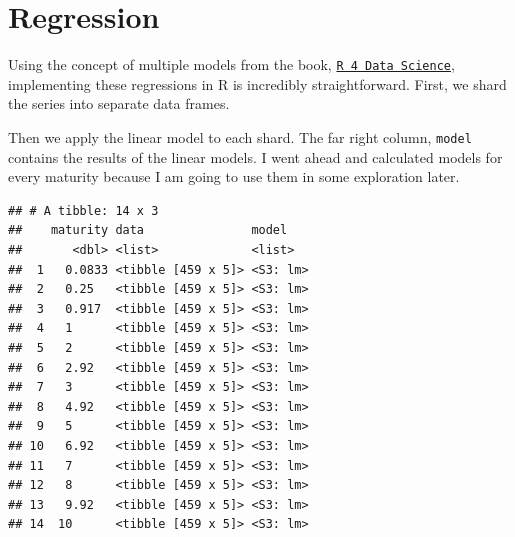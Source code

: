 \documentclass[]{book}
\newenvironment{Shaded}{\begin{snugshade}}{\end{snugshade}}
\newcommand{\CommentTok}[1]{\textcolor[rgb]{0.56,0.35,0.01}{\textit{#1}}}
\newcommand{\DataTypeTok}[1]{\textcolor[rgb]{0.13,0.29,0.53}{#1}}
\newcommand{\KeywordTok}[1]{\textcolor[rgb]{0.13,0.29,0.53}{\textbf{#1}}}
\newcommand{\NormalTok}[1]{#1}
\newcommand{\OperatorTok}[1]{\textcolor[rgb]{0.81,0.36,0.00}{\textbf{#1}}}
\newcommand{\StringTok}[1]{\textcolor[rgb]{0.31,0.60,0.02}{#1}}
\theoremstyle{definition}
\theoremstyle{definition}
\theoremstyle{definition}
\theoremstyle{remark}
\begin{document}
\hypertarget{regression}{%
\section{Regression}\label{regression}}

Using the concept of multiple models from the book,
\href{http://r4ds.had.co.nz/many-models.html}{\texttt{R\ 4\ Data\ Science}},
implementing these regressions in R is incredibly straightforward.
First, we shard the series into separate data frames.

\begin{Shaded}
\end{Shaded}

Then we apply the linear model to each shard. The far right column,
\texttt{model} contains the results of the linear models. I went ahead
and calculated models for every maturity because I am going to use them
in some exploration later.

\begin{Shaded}
\end{Shaded}

\begin{verbatim}
## # A tibble: 14 x 3
##    maturity data               model   
##       <dbl> <list>             <list>  
##  1   0.0833 <tibble [459 x 5]> <S3: lm>
##  2   0.25   <tibble [459 x 5]> <S3: lm>
##  3   0.917  <tibble [459 x 5]> <S3: lm>
##  4   1      <tibble [459 x 5]> <S3: lm>
##  5   2      <tibble [459 x 5]> <S3: lm>
##  6   2.92   <tibble [459 x 5]> <S3: lm>
##  7   3      <tibble [459 x 5]> <S3: lm>
##  8   4.92   <tibble [459 x 5]> <S3: lm>
##  9   5      <tibble [459 x 5]> <S3: lm>
## 10   6.92   <tibble [459 x 5]> <S3: lm>
## 11   7      <tibble [459 x 5]> <S3: lm>
## 12   8      <tibble [459 x 5]> <S3: lm>
## 13   9.92   <tibble [459 x 5]> <S3: lm>
## 14  10      <tibble [459 x 5]> <S3: lm>
\end{verbatim}
\end{document}

